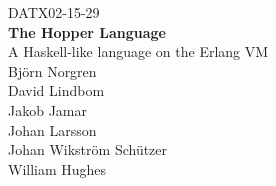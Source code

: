 \newpage
\thispagestyle{empty}
\begin{center}
	\textsc{\large DATX02-15-29}\\[4cm]
	\textbf{\Large The Hopper Language} \\[1cm]
	{\large A Haskell-like language on the Erlang VM}\\[1cm]
  {\Large Björn Norgren \\
          David Lindbom \\
          Jakob Jamar   \\
          Johan Larsson \\
          Johan Wikström Schützer \\
          William Hughes }\\[2.0cm]
	
	\vfill	
	\begin{figure}[h!]
	\centering
         \\	
	\end{figure}	\vspace{5mm}	
	

\end{center}
